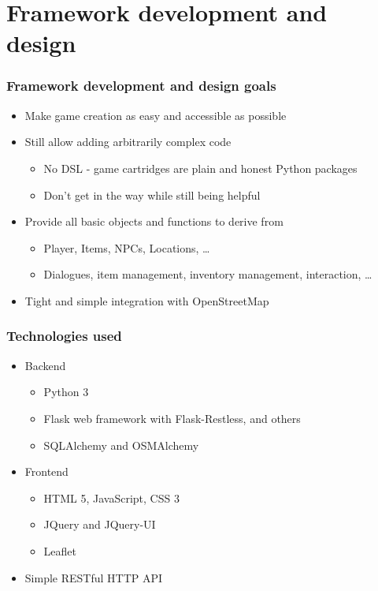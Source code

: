 \documentclass[aspectratio=43]{beamer}
\begin{document}
 \section{Framework development and design}

 \begin{frame}
  \frametitle{Framework development and design goals}

  \begin{itemize}
   \item{Make game creation as easy and accessible as possible}
   \item{Still allow adding arbitrarily complex code
    \begin{itemize}
     \item{No DSL - game cartridges are plain and honest Python packages}
     \item{Don't get in the way while still being helpful}
    \end{itemize}
   }
   \item{Provide all basic objects and functions to derive from
    \begin{itemize}
     \item{Player, Items, NPCs, Locations, …}
     \item{Dialogues, item management, inventory management, interaction, …}
    \end{itemize}
   }
   \item{Tight and simple integration with OpenStreetMap}
  \end{itemize}
 \end{frame}

 \begin{frame}
  \frametitle{Technologies used}

  \begin{itemize}
   \item{Backend
    \begin{itemize}
     \item{Python 3}
     \item{Flask web framework with Flask-Restless, and others}
     \item{SQLAlchemy and OSMAlchemy}
    \end{itemize}
   }
   \item{Frontend
    \begin{itemize}
     \item{HTML 5, JavaScript, CSS 3}
     \item{JQuery and JQuery-UI}
     \item{Leaflet}
    \end{itemize}
   }
   \item{Simple RESTful HTTP API}
  \end{itemize}
 \end{frame}
\end{document}
